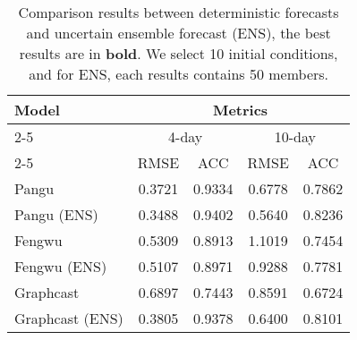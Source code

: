     \begin{table}[t]
    \vspace{-3mm}
    \caption{Comparison results between deterministic forecasts and uncertain ensemble forecast (ENS), the best results are in \textbf{bold}. We select 10 initial conditions, and for ENS, each results contains 50 members.}
    \small
    \label{tab:ens}
    \vspace{-5pt}
    \vskip 0.13in
    \centering
    \begin{small}
        \begin{sc}
            \renewcommand{\multirowsetup}{\centering}
            \setlength{\tabcolsep}{3.8pt} %
            \begin{tabular}{l|cccc}
            \toprule
            \multirow[c]{4}{*}{Model} & \multicolumn{4}{c}{Metrics}                                                                                        \\ \cmidrule(lr){2-5} 
                                   & \multicolumn{2}{c}{4-day}                                & \multicolumn{2}{c}{10-day}                              \\ \cmidrule(lr){2-5} 
                                   & RMSE                       & ACC                         & RMSE                       & ACC                        \\ \midrule
            Pangu                  & 0.3721                     & \multicolumn{1}{c|}{0.9334} & 0.6778                     & 0.7862                     \\
            Pangu (ENS)            & 0.3488                     & \multicolumn{1}{c|}{0.9402} & 0.5640                     & 0.8236                     \\
            Fengwu                 & 0.5309                     & \multicolumn{1}{c|}{0.8913} & 1.1019                     & 0.7454                     \\
            Fengwu (ENS)           & 0.5107                     & \multicolumn{1}{c|}{0.8971} & 0.9288                     & 0.7781                     \\
            Graphcast              & 0.6897                     & \multicolumn{1}{c|}{0.7443} & 0.8591                     & 0.6724                     \\
            Graphcast (ENS)        & 0.3805                     & \multicolumn{1}{c|}{0.9378} & 0.6400                     & 0.8101                     \\

\end{tabular}
\end{sc}
\end{small}
\end{table}
